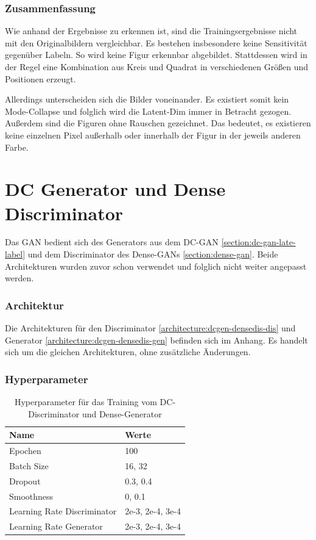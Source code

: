 \subsubsection{Zusammenfassung}
Wie anhand der Ergebnisse zu erkennen ist, sind die Trainingsergebnisse nicht mit den Originalbildern vergleichbar.
Es bestehen insbesondere keine Sensitivität gegenüber Labeln.
So wird keine Figur erkennbar abgebildet.
Stattdessen wird in der Regel eine Kombination aus Kreis und Quadrat in verschiedenen Größen und Positionen erzeugt.
\newline

Allerdings unterscheiden sich die Bilder voneinander.
Es existiert somit kein Mode-Collapse und folglich wird die Latent-Dim immer in Betracht gezogen.
Außerdem sind die Figuren ohne Rauschen gezeichnet.
Das bedeutet, es existieren keine einzelnen Pixel außerhalb oder innerhalb der Figur in der jeweils anderen Farbe.



\section{DC Generator und Dense Discriminator}
Das GAN bedient sich des Generators aus dem DC-GAN \cref{section:dc-gan-late-label} und dem Discriminator des Dense-GANs \cref{section:dense-gan}.
Beide Architekturen wurden zuvor schon verwendet und folglich nicht weiter angepasst werden.

\subsubsection{Architektur}
Die Architekturen für den Discriminator \cref{architecture:dcgen-densedis-dis} und Generator \cref{architecture:dcgen-densedis-gen} befinden sich im Anhang.
Es handelt sich um die gleichen Architekturen, ohne zusätzliche Änderungen.

\subsubsection{Hyperparameter}
\begin{table}[H]
	\centering
	\begin{tabular}{l l}
		Name                        & Werte            \\ \hline
		Epochen                     & 100              \\
		Batch Size                  & 16, 32           \\
		Dropout                     & 0.3, 0.4         \\
		Smoothness                  & 0, 0.1           \\
		Learning Rate Discriminator & 2e-3, 2e-4, 3e-4 \\
		Learning Rate Generator     & 2e-3, 2e-4, 3e-4
	\end{tabular}
	\caption{Hyperparameter für das Training vom DC-Discriminator und Dense-Generator}
\end{table}
